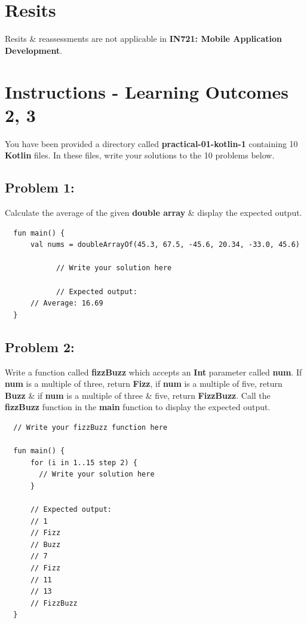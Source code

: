 \documentclass{article}
\begin{document}
\section*{Resits}
Resits \& reassessments are not applicable in \textbf{IN721: Mobile Application Development}.

\section*{Instructions - Learning Outcomes 2, 3}
You have been provided a directory called \textbf{practical-01-kotlin-1} containing 10 \textbf{Kotlin} files. In these files, write your solutions to the 10 problems below. 

\subsection*{Problem 1:} 
Calculate the average of the given \textbf{double array} \& display the expected output.

\begin{verbatim}
  fun main() {
      val nums = doubleArrayOf(45.3, 67.5, -45.6, 20.34, -33.0, 45.6)
      
			// Write your solution here
      
			// Expected output:
      // Average: 16.69 
  }
\end{verbatim}

\subsection*{Problem 2:}
Write a function called \textbf{fizzBuzz} which accepts an \textbf{Int} parameter called \textbf{num}. If \textbf{num} is a multiple of three, return \textbf{Fizz}, if \textbf{num} is a multiple of five, return \textbf{Buzz} \& if \textbf{num} is a multiple of three \& five, return \textbf{FizzBuzz}. Call the \textbf{fizzBuzz} function in the \textbf{main} function to display the expected output.

\begin{verbatim}
  // Write your fizzBuzz function here
  
  fun main() {
      for (i in 1..15 step 2) {
        // Write your solution here
      }

      // Expected output:
      // 1
      // Fizz
      // Buzz
      // 7
      // Fizz
      // 11
      // 13
      // FizzBuzz
  }
\end{verbatim}
\end{document}
